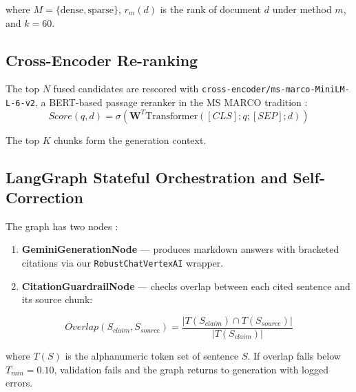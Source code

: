 where $M=\{\text{dense}, \text{sparse}\}$, $r_m(d)$ is the rank of document $d$ under method $m$, and $k=60$.

\subsection{Cross-Encoder Re-ranking}
The top $N$ fused candidates are rescored with \texttt{cross-encoder/ms-marco-MiniLM-L-6-v2}, a BERT-based passage reranker in the MS MARCO tradition \citep{nogueira2019passage}:
\begin{equation}
Score(q, d) = \sigma(\mathbf{W}^T \text{Transformer}([CLS]; q; [SEP]; d))
\end{equation}

The top $K$ chunks form the generation context.

\subsection{LangGraph Stateful Orchestration and Self-Correction}
The graph has two nodes \citep{langgraph2024}:
\begin{enumerate}
    \item \textbf{GeminiGenerationNode} --- produces markdown answers with bracketed citations via our \texttt{RobustChatVertexAI} wrapper.
    \item \textbf{CitationGuardrailNode} --- checks overlap between each cited sentence and its source chunk:
\end{enumerate}

\begin{equation}
Overlap(S_{claim}, S_{source}) = \frac{|T(S_{claim}) \cap T(S_{source})|}{|T(S_{claim})|}
\end{equation}

where $T(S)$ is the alphanumeric token set of sentence $S$. If overlap falls below $T_{min}=0.10$, validation fails and the graph returns to generation with logged errors.
